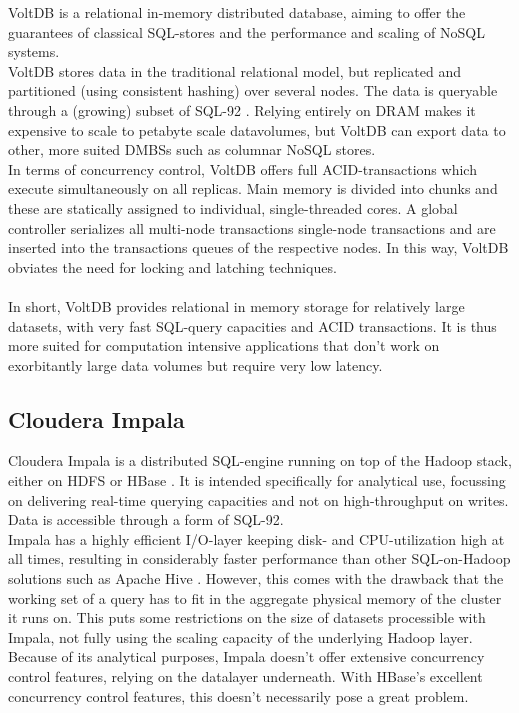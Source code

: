 \documentclass{article}
\begin{document}
VoltDB is a relational in-memory distributed database, aiming to offer the guarantees of classical SQL-stores and the performance and scaling of NoSQL systems\cite{stonebraker2013voltdb}. %
\\VoltDB stores data in the traditional relational model, but replicated and partitioned (using consistent hashing) over several nodes\cite{grolinger2013data}. The data is queryable through a (growing) subset of SQL-92 \cite{voltdb2010voltdb}.
Relying entirely on DRAM makes it expensive to scale to petabyte scale datavolumes, but VoltDB can export data to other, more suited DMBSs such as columnar NoSQL stores.
\\In terms of concurrency control, VoltDB offers full ACID-transactions which execute simultaneously on all replicas. Main memory is divided into chunks and these are statically assigned to individual, single-threaded cores. A global controller serializes all multi-node transactions single-node transactions and are inserted into the transactions queues of the respective nodes. In this way, VoltDB obviates the need for locking and latching techniques.
\\\\
In short, VoltDB provides relational in memory storage for relatively large datasets, with very fast SQL-query capacities and ACID transactions. It is thus more suited for computation intensive applications that don't work on exorbitantly large data volumes but require very low latency.

\subsection{Cloudera Impala}

Cloudera Impala is a distributed SQL-engine running on top of the Hadoop stack, either on HDFS or HBase \cite{cloudera_impala}. It is intended specifically for analytical use, focussing on delivering real-time querying capacities and not on high-throughput on writes.
\\Data is accessible through a form of SQL-92.
\\Impala has a highly efficient I/O-layer keeping disk- and CPU-utilization high at all times, resulting in considerably faster performance than other SQL-on-Hadoop solutions such as Apache Hive \cite{floratou2014sql}. However, this comes with the drawback that the working set of a query has to fit in the aggregate physical memory of the cluster it runs on. This puts some restrictions on the size of datasets processible with Impala, not fully using the scaling capacity of the underlying Hadoop layer.
\\Because of its analytical purposes, Impala doesn't offer extensive concurrency control features, relying on the datalayer underneath. With HBase's excellent concurrency control features, this doesn't necessarily pose a great problem.
 

{}

\end{document}
